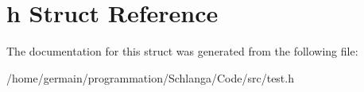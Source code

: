 \hypertarget{structtest_1_1h}{\section{h Struct Reference}
\label{structtest_1_1h}
}


The documentation for this struct was generated from the following file\-:\begin{DoxyCompactItemize}
\item 
/home/germain/programmation/\-Schlanga/\-Code/src/test.\-h\end{DoxyCompactItemize}
